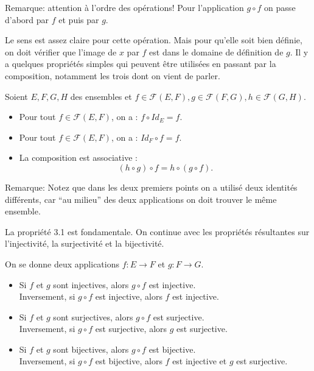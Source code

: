 \documentclass{article}
\begin{document}
Remarque: attention à l'ordre des opérations! Pour l'application $g \circ f$ on passe d'abord par $f$ et puis par $g$.

Le sens est assez claire pour cette opération. Mais pour qu'elle soit bien définie, on doit vérifier que l'image de $x$ par $f$ est dans le domaine de définition de $g$. Il y a quelques propriétés simples qui peuvent être utilisées en passant par la composition, notamment les trois dont on vient de parler.

\begin{tcolorbox}[colback=blue!5!white,colframe=blue!75!black,title=Propriété 3.1]

Soient $E, F, G, H$ des ensembles et $f \in \mathcal{F}(E,F), g \in \mathcal{F}(F,G), h \in \mathcal{F}(G,H)$.
\begin{itemize}
    \item Pour tout $f \in \mathcal{F}(E,F)$, on a : $f \circ Id_E = f$.
    \item Pour tout $f \in \mathcal{F}(E,F)$, on a : $Id_F \circ f = f$.
    \item La composition est associative : 
    \[
    (h \circ g) \circ f = h \circ (g \circ f).
    \]
\end{itemize}

\end{tcolorbox} 

Remarque: Notez que dans les deux premiers points on a utilisé deux identités différents, car ``au milieu'' des deux applications on doit trouver le même ensemble.

La propriété 3.1 est fondamentale. On continue avec les propriétés résultantes sur l'injectivité, la surjectivité et la bijectivité.


\begin{tcolorbox}[colback=blue!5!white,colframe=blue!75!black,title=Propriété 3.2]

On se donne deux applications $f : E \to F$ et $g : F \to G$.

\begin{itemize}
    \item Si $f$ et $g$ sont injectives, alors $g \circ f$ est injective. \\
    Inversement, si $g \circ f$ est injective, alors $f$ est injective.

    \item Si $f$ et $g$ sont surjectives, alors $g \circ f$ est surjective. \\
    Inversement, si $g \circ f$ est surjective, alors $g$ est surjective.

    \item Si $f$ et $g$ sont bijectives, alors $g \circ f$ est bijective. \\
    Inversement, si $g \circ f$ est bijective, alors $f$ est injective et $g$ est surjective.
\end{itemize}

\end{tcolorbox} 
\end{document}

